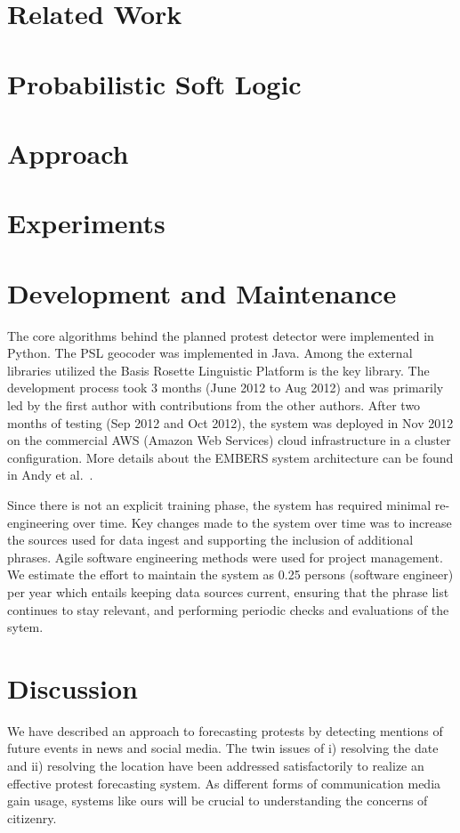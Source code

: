 \documentclass[letterpaper]{article}
\begin{document}
\section{Related Work}


\section{Probabilistic Soft Logic}

\label{section:PSL}

\section{Approach}


\section{Experiments}


\section{Development and Maintenance}
The core algorithms behind the
planned protest detector were implemented in Python. The PSL geocoder was
implemented in Java. Among the external libraries utilized the Basis Rosette Linguistic Platform is the key
library. The development process took 3 months (June
2012 to Aug 2012) and was
primarily led by the first author with contributions from the other authors.
After two months of testing (Sep 2012 and Oct 2012), the system was deployed
in Nov 2012 on the commercial AWS (Amazon
Web Services) cloud infrastructure in a cluster configuration.
More details about the EMBERS 
system architecture can be found in
Andy et al.~.

Since there is not an explicit training
phase, the system has required minimal re-engineering over time. Key changes
made to the system over time was to increase the sources used for data ingest
and supporting the inclusion of additional phrases. Agile software
engineering methods were used for project management. We estimate the
effort to maintain the system as 0.25 persons (software engineer) per year
which entails keeping data sources current, ensuring that
the phrase list continues to stay relevant, and performing periodic 
checks and evaluations of the sytem.

\section{Discussion}
We have described an approach to forecasting protests by detecting
mentions of future events in news and social media. The twin issues
of i) resolving the date and ii) resolving the location have been
addressed satisfactorily to realize an effective protest forecasting
system. As different forms of communication media gain usage, systems
like ours will be crucial to understanding the concerns of citizenry.
\end{document}
